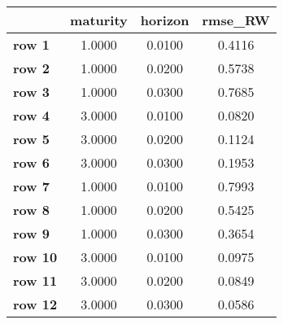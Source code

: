 \begin{tiny}\begin{tabular}{|l|c|c|c|}
\hline
&\textbf{maturity}&\textbf{horizon}&\textbf{rmse_RW}\\\hline
\textbf{row 1}&1.0000&0.0100&0.4116\\\hline
\textbf{row 2}&1.0000&0.0200&0.5738\\\hline
\textbf{row 3}&1.0000&0.0300&0.7685\\\hline
\textbf{row 4}&3.0000&0.0100&0.0820\\\hline
\textbf{row 5}&3.0000&0.0200&0.1124\\\hline
\textbf{row 6}&3.0000&0.0300&0.1953\\\hline
\textbf{row 7}&1.0000&0.0100&0.7993\\\hline
\textbf{row 8}&1.0000&0.0200&0.5425\\\hline
\textbf{row 9}&1.0000&0.0300&0.3654\\\hline
\textbf{row 10}&3.0000&0.0100&0.0975\\\hline
\textbf{row 11}&3.0000&0.0200&0.0849\\\hline
\textbf{row 12}&3.0000&0.0300&0.0586\\\hline
\end{tabular}
\end{tiny}